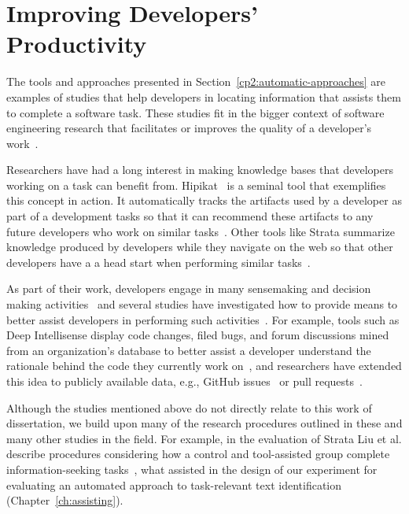 



\section{Improving Developers' Productivity}
\label{cp2:dev-productivity}



The tools and approaches presented in Section~\ref{cp2:automatic-approaches}
are examples of studies that help developers in locating 
information that assists them to complete a software task.
These studies fit in the bigger context 
of software engineering research 
that facilitates or improves the quality of a developer's work~\cite{Kersten2006, Meyer2017, satterfield2020}. 



Researchers have had a long interest in 
making knowledge bases
that developers working on a task can benefit from. 
Hipikat~\cite{Cubranic2005} is a seminal tool that exemplifies this concept in action.
It automatically tracks the artifacts 
used by a developer as part of a development tasks
so that it can recommend these artifacts to 
any future developers who work on similar tasks~\cite{Cubranic2005}.
Other tools like Strata summarize knowledge produced by developers 
while they navigate on the web so that other developers have a 
a head start when performing similar tasks~\cite{liu2021}.



As part of their work, developers engage in many sensemaking and decision making activities~\cite{sillito2006} and several studies have investigated how to 
provide means to better  
assist developers in performing such activities~\cite{Liu2018Unakite, liu2021, barnett2015}.
For example, tools such as Deep Intellisense 
display code changes, filed bugs, and forum discussions 
mined from an organization's database to better assist a developer
understand 
the rationale behind the code they currently work on~\cite{Holmes2008},
and researchers have extended this idea to  
publicly available data, e.g., GitHub issues~\cite{Viviani2019}
or pull requests~\cite{freire2021}. 



Although the studies mentioned above do not directly relate 
to this work of dissertation, 
we build upon many of the research procedures outlined 
in these and many other studies in the field. 
For example, in the evaluation of Strata 
 Liu et al. describe procedures 
considering how a control and tool-assisted group 
complete information-seeking tasks~\cite{liu2021},
what assisted in the design of our experiment for 
evaluating an automated approach to
task-relevant text identification (Chapter~\ref{ch:assisting}).



